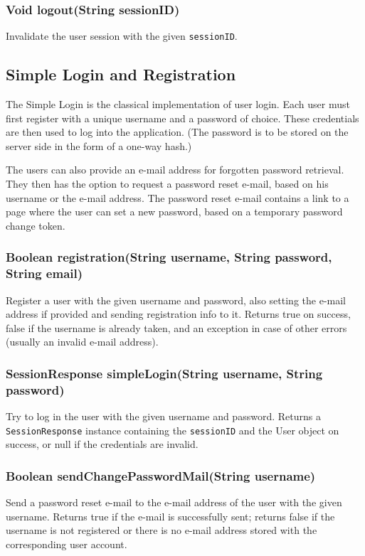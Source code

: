 \subsubsection{Void logout(String sessionID)}
Invalidate the user session with the given {\tt sessionID}.

\subsection{Simple Login and Registration}
\label{subsec:simple_login}

The Simple Login is the classical implementation of user login. Each user must first register with a unique username and a password of choice. These credentials are then used to log into the application. (The password is to be stored on the server side in the form of a one-way hash.)

The users can also provide an e-mail address for forgotten password retrieval. They then has the option to request a password reset e-mail, based on his username or the e-mail address. The password reset e-mail contains a link to a page where the user can set a new password, based on a temporary password change token.

\subsubsection{Boolean registration(String username, String password, String email)}
Register a user with the given username and password, also setting the e-mail address if provided and sending registration info to it.
Returns true on success, false if the username is already taken, and an exception in case of other errors (usually an invalid e-mail address).

\subsubsection{SessionResponse simpleLogin(String username, String password)}
Try to log in the user with the given username and password.
Returns a {\tt SessionResponse} instance containing the {\tt sessionID} and the User object on success, or null if the credentials are invalid.

\subsubsection{Boolean sendChangePasswordMail(String username)}
Send a password reset e-mail
to the e-mail address of the user with the given username.
Returns true if the e-mail is successfully sent;
returns false if the username is not registered or there is no e-mail address stored with the corresponding user account.

